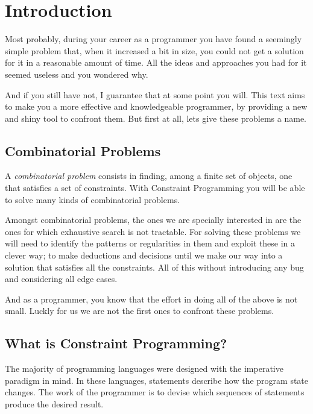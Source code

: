 \section{Introduction}

Most probably, during your career as a programmer you have found
a seemingly simple problem that, when it increased a bit in size, you could not
get a solution for it in a reasonable amount of time. All the ideas and approaches
you had for it seemed useless and you wondered why.

And if you still have not, I guarantee that at some point you will.
This text aims to make you a more effective and knowledgeable programmer,
by providing a new and shiny tool to confront them. But first at all, lets give 
these problems a name.


\subsection{Combinatorial Problems}

A \emph{combinatorial problem} consists in finding, among a finite set of
objects, one that satisfies a set of constraints. With Constraint Programming
you will be able to solve many kinds of combinatorial problems. 

Amongst combinatorial problems, the ones we are specially interested in are the
ones for which exhaustive search is not tractable. For solving these problems
we will need to identify the patterns or regularities in them and exploit these
in a clever way; to make deductions and decisions until we make our way into a
solution that satisfies all the constraints. All of this without introducing any
bug and considering all edge cases.

And as a programmer, you know that the effort in doing all of the above is not
small. Luckly for us we are not the first ones to confront these problems.

\subsection{What is Constraint Programming?}

The majority of programming languages were designed with the imperative
paradigm in mind. In these languages, statements describe how the program state
changes.  The work of the programmer is to devise which sequences of statements
produce the desired result.

